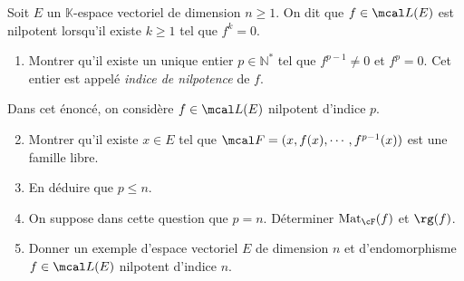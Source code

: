 Soit $E$ un $\mathbb K$-espace vectoriel de dimension $n \geqslant 1$. On dit que $f \in \mcal L(E)$ est nilpotent lorsqu'il existe $k \geqslant 1$ tel que $f^k=0$.
\begin{enumerate}
\item Montrer qu'il existe un unique entier $p\in\mathbb N^\ast$ tel que $f^{p-1} \neq 0$ et $f^p=0$. Cet entier est appelé \emph{indice de nilpotence} de $f$.
\end{enumerate}

Dans cet énoncé, on considère $f \in \mcal L(E)$ nilpotent d'indice $p$.

\begin{enumerate}\setcounter{enumi}{1}
\item Montrer qu'il existe $x\in E$ tel que $\mcal F=(x,f(x),\cdots,f^{p-1}(x))$ est une famille libre.
\item En déduire que $p \leqslant n$.
\item On suppose dans cette question que $p=n$. Déterminer $\mathrm{Mat}_\cF(f)$ et $\rg(f)$.
\item Donner un exemple d'espace vectoriel $E$ de dimension $n$ et d'endomorphisme $f \in \mcal L(E)$ nilpotent d'indice $n$.
\end{enumerate}
